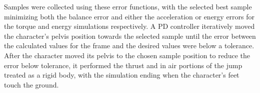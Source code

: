 Samples were collected using these error functions, with the selected best sample minimizing both the balance error and either the acceleration or energy errors for the torque and energy simulations respectively.  A PD controller iteratively moved the character's pelvis position towards the selected sample until the error between the calculated values for the frame and the desired values were below a tolerance.  After the character moved its pelvis to the chosen sample position to reduce the error below tolerance, it performed the thrust and in air portions of the jump treated as a rigid body, with the simulation ending when the character's feet touch the ground.